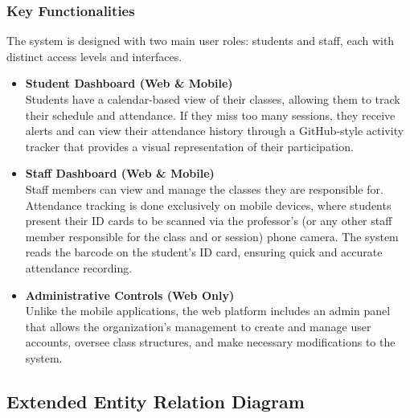 \documentclass[a4paper, 12pt]{article}
\begin{document}
      \subsubsection{Key Functionalities}
      The system is designed with two main user roles: students and staff, each with distinct access levels and interfaces.
      \begin{itemize}
        \item \textbf{Student Dashboard (Web \& Mobile)} \\
        Students have a calendar-based view of their classes, allowing them to track their schedule and attendance. If they miss too many sessions, they receive alerts and can view their attendance history through a GitHub-style activity tracker that provides a visual representation of their participation.
        \item \textbf{Staff Dashboard (Web \& Mobile)} \\
        Staff members can view and manage the classes they are responsible for. Attendance tracking is done exclusively on mobile devices, where students present their ID cards to be scanned via the professor's (or any other staff member responsible for the class and or session) phone camera. The system reads the barcode on the student’s ID card, ensuring quick and accurate attendance recording.
        \item \textbf{Administrative Controls (Web Only)} \\
        Unlike the mobile applications, the web platform includes an admin panel that allows the organization's management to create and manage user accounts, oversee class structures, and make necessary modifications to the system.
      \end{itemize}

    \newpage
    \subsection{Extended Entity Relation Diagram} \label{sec: EER}
      
\end{document}
